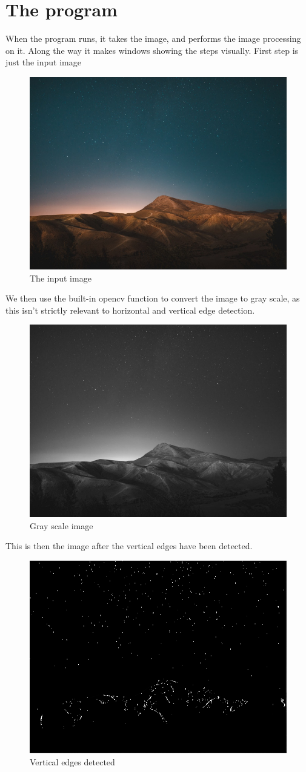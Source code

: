 \chapter{The program}
When the program runs, it takes the image, and performs the image processing on it. Along the way it makes windows showing the steps visually. First step is just the input image
	\begin{figure}[H]
		\centering
		\includegraphics[width=0.6\linewidth]{figure/originalImage}
		\caption{The input image}
		\label{fig:originalImage}
	\end{figure}
	We then use the built-in opencv function to convert the image to gray scale, as this isn't strictly relevant to horizontal and vertical edge detection.
	\begin{figure}[H]
		\centering
		\includegraphics[width=0.6\linewidth]{figure/grayScaleImage}
		\caption{Gray scale image}
		\label{fig:grayScaleImage}
	\end{figure}
	This is then the image after the vertical edges have been detected.
	\begin{figure}[H]
		\centering
		\includegraphics[width=0.6\linewidth]{figure/xEdge}
		\caption{Vertical edges detected}
		\label{fig:xEdge}
	\end{figure}
